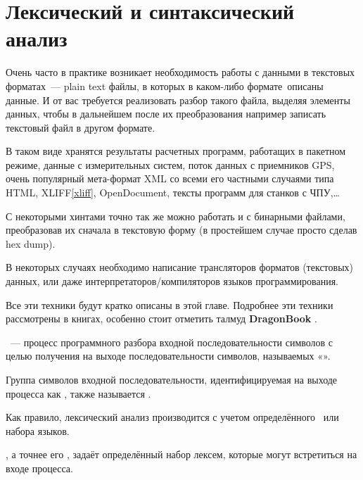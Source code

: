 \chapter{Лексический и синтаксический анализ}

Очень часто в практике возникает необходимость работы с данными в текстовых
форматах\ --- plain text файлы, в которых в каком-либо формате\ описаны данные. И от вас
требуется реализовать разбор такого файла, выделяя элементы данных, чтобы в
дальнейшем после их преобразования например записать текстовый файл в другом
формате.

В таком виде хранятся результаты расчетных программ, работащих в пакетном
режиме, данные с измерительных систем, поток данных с приемников GPS, очень популярный мета-формат XML со всеми его частными случаями типа
HTML, XLIFF\ref{xliff}, OpenDocument, тексты программ для станков с ЧПУ,\ldots

С некоторыми хинтами точно так же можно работать и с бинарными файлами,
преобразовав их сначала в текстовую форму (в простейшем случае просто сделав hex
dump).

В некоторых случаях необходимо написание трансляторов форматов (текстовых)
данных, или даже интерпретаторов/компиляторов языков программирования.

Все эти техники будут кратко описаны в этой главе. Подробнее эти техники
рассмотрены в книгах, особенно стоит отметить талмуд
\textbf{DragonBook} \cite{dragonbook}.

\begin{framed}
\ --- процесс программного разбора входной
последовательности символов с целью получения на выходе последовательности
символов, называемых «».

Группа символов входной последовательности, идентифицируемая на выходе процесса как
, также называется . 
\end{framed}

Как правило, лексический анализ производится с учетом определённого
\ или набора языков. 

\begin{framed}
, а точнее его
, задаёт определённый набор лексем, которые могут встретиться
на входе процесса.
\end{framed}

